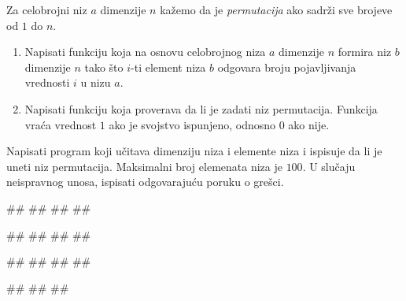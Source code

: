 \ifresenja
\begin{Answer}[ref=podniz]
\end{Answer}
\fi


\begin{Exercise}[label=permutacija] 
Za celobrojni niz $a$ dimenzije $n$ kažemo da je \textit{permutacija}
ako sadrži sve brojeve od $1$ do $n$.
\begin{enumerate}
\setlength\itemsep{0em}
\item Napisati funkciju 
  koja na osnovu celobrojnog niza $a$ dimenzije $n$ formira niz $b$ dimenzije  $n$
  tako što $i$-ti element niza $b$ odgovara broju pojavljivanja
  vrednosti $i$ u nizu $a$.
\item Napisati funkciju  koja
  proverava da li je zadati niz permutacija. Funkcija vraća vrednost
  $1$ ako je svojstvo ispunjeno, odnosno $0$ ako
  nije. 
\end{enumerate}
Napisati program koji učitava dimenziju niza i
elemente niza i ispisuje da li je uneti niz permutacija. 
Maksimalni broj elemenata niza je $100$.
U slučaju neispravnog unosa, ispisati odgovarajuću poruku o grešci. 

\begin{miditest}
\begin{upotreba}{1}
#\naslovInt#
##
##
##
\end{upotreba}
\end{miditest}
\begin{miditest}
\begin{upotreba}{2}
#\naslovInt#
##
##
##
\end{upotreba}
\end{miditest}

\begin{miditest}
\begin{upotreba}{3}
#\naslovInt#
##
##
##
\end{upotreba}
\end{miditest}
\begin{miditest}
\begin{upotreba}{4}
#\naslovInt#
##
##
\end{upotreba}
\end{miditest}
\end{Exercise}

